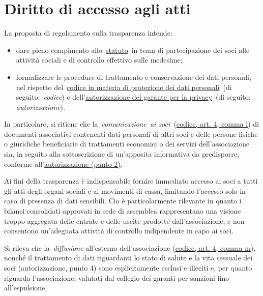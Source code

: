 \section{Diritto di accesso agli atti}
La proposta di regolamento sulla trasparenza intende:

\begin{itemize}
    \item
        dare pieno compimento
        allo~\href{http://www.alumniscuolagalileiana.it/wp-content/uploads/2017/03/Statuto-Alumni-SGSS.pdf}{statuto}~in
        tema di partecipazione dei soci alle attività sociali e di controllo
        effettivo sulle medesime;
    \item
        formalizzare le procedure di trattamento e conservazione dei dati
        personali, nel rispetto
        del~\href{http://www.garanteprivacy.it/web/guest/home/docweb/-/docweb-display/docweb/1311248}{codice
        in materia di protezione dei dati personali}~(di
        seguito:~\emph{codice}) e
        dell'\href{http://garanteprivacy.it/web/guest/home/docweb/-/docweb-display/docweb/5803310}{autorizzazione
        del garante per la privacy}~(di seguito: \emph{autorizzazione}).
\end{itemize}

In particolare, si ritiene che la~\emph{comunicazione}~\emph{ai
soci}~(\href{http://www.garanteprivacy.it/web/guest/home/docweb/-/docweb-display/docweb/1311248}{codice,
art. 4, comma l}) di documenti associativi contenenti dati personali di
altri soci e delle persone fisiche o giuridiche beneficiarie di
trattamenti economici o dei servizi dell'associazione sia, in seguito
alla sottoscrizione di un'apposita informativa da predisporre, conforme
all'\href{http://garanteprivacy.it/web/guest/home/docweb/-/docweb-display/docweb/5803310}{autorizzazione
(punto 2)}.

Ai fini della trasparenza è indispensabile fornire immediato accesso ai soci a tutti gli
atti degli organi sociali e ai movimenti di cassa, limitando l'accesso solo
in caso di presenza di dati sensibili.
Cio è particolarmente rilevante in quanto i bilanci consolidati approvati in
sede di assemblea rappresentano una visione troppo aggregata delle entrate
e delle uscite prodotte dall'associazione, e non consentono un'adeguata attività
di controllo indipendente in capo ai soci. 

Si rileva che la~\emph{diffusione} all'esterno dell'associazione
(\href{http://www.garanteprivacy.it/web/guest/home/docweb/-/docweb-display/docweb/1311248}{codice,
art. 4, comma m}), nonché il trattamento di dati riguardanti lo stato di
salute e la vita sessuale dei soci (autorizzazione, punto 4) sono
esplicitamente esclusi e illeciti e, per quanto riguarda
l'associazione, valutati dal collegio dei garanti per sanzioni
fino all'espulsione.

